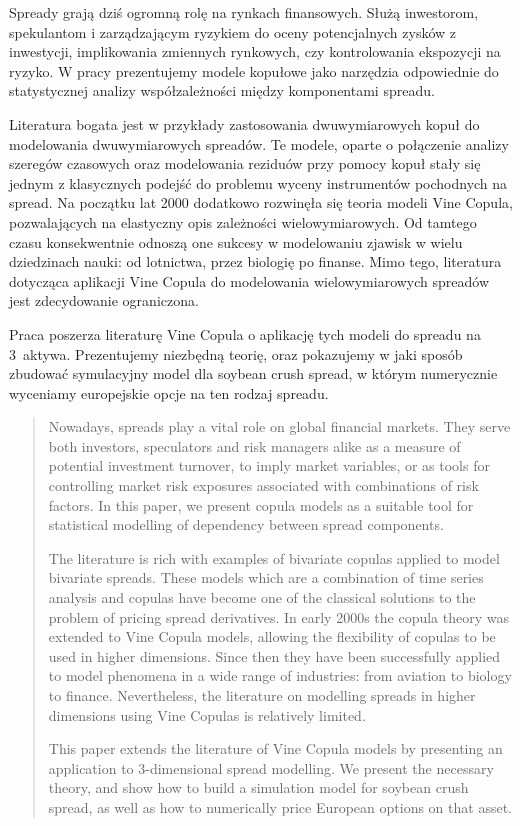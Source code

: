 \begin{streszczenie}
	Spready grają dziś ogromną rolę na rynkach finansowych. Służą inwestorom, spekulantom i zarządzającym ryzykiem do oceny potencjalnych zysków z inwestycji, implikowania zmiennych rynkowych, czy kontrolowania ekspozycji na ryzyko. W pracy prezentujemy modele kopułowe jako narzędzia odpowiednie do statystycznej analizy współzależności między komponentami spreadu. 
	
	Literatura bogata jest w przykłady zastosowania dwuwymiarowych kopuł do modelowania dwuwymiarowych spreadów. Te modele, oparte o połączenie analizy szeregów czasowych oraz modelowania reziduów przy pomocy kopuł stały się jednym z klasycznych podejść do problemu wyceny instrumentów pochodnych na spread. Na początku lat 2000 dodatkowo rozwinęła się teoria modeli Vine Copula, pozwalających na elastyczny opis zależności wielowymiarowych. Od tamtego czasu konsekwentnie odnoszą one sukcesy w modelowaniu zjawisk w wielu dziedzinach nauki: od lotnictwa, przez biologię po finanse. Mimo tego, literatura dotycząca aplikacji Vine Copula do modelowania wielowymiarowych spreadów jest zdecydowanie ograniczona. 
	
	Praca poszerza literaturę Vine Copula o aplikację tych modeli do spreadu na 3~aktywa. Prezentujemy niezbędną teorię, oraz pokazujemy w jaki sposób zbudować symulacyjny model dla soybean crush spread, w którym numerycznie wyceniamy europejskie opcje na ten rodzaj spreadu. 
\end{streszczenie}

\begin{abstract}
	Nowadays, spreads play a vital role on global financial markets. They serve both investors, speculators and risk managers alike as a measure of potential investment turnover, to imply market variables, or as tools for controlling market risk exposures associated with combinations of risk factors. In this paper, we present copula models as a suitable tool for statistical modelling of dependency between spread components.
	
	The literature is rich with examples of bivariate copulas applied to model bivariate spreads. These models which are a combination of time series analysis and copulas have become one of the classical solutions to the problem of pricing spread derivatives. In early 2000s the copula theory was extended to Vine Copula models, allowing the flexibility of copulas to be used in higher dimensions. Since then they have been successfully applied to model phenomena in a wide range of industries: from aviation to biology to finance. Nevertheless, the literature on modelling spreads in higher dimensions using Vine Copulas is relatively limited.
	
	This paper extends the literature of Vine Copula models by presenting an application to 3-dimensional spread modelling. We present the necessary theory, and show how to build a simulation model for soybean crush spread, as well as how to numerically price European options on that asset.
	
\end{abstract}
